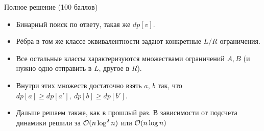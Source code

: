 \begin{frame}{Полное решение (100 баллов)}
  \begin{itemize}
  \item Бинарный поиск по ответу, такая же $dp[v]$.
  \item Рёбра в том же классе эквивалентности задают конкретные $L/R$ ограничения.
  \item Все остальные классы характеризуются множествами ограничений $A, B$ (и нужно одно отправить в $L$, другое в $R$).
  \item Внутри этих множеств достаточно взять $a,\,b$ так, что $dp[a] \ge dp[a'],\ dp[b] \ge dp[b']$.
  \item Дальше решаем также, как в прошлый раз. В зависимости от подсчета динамики решили за $\mathcal{O}(n \log^2 n)$ или $\mathcal{O}(n \log n)$
  \end{itemize}
\end{frame}
